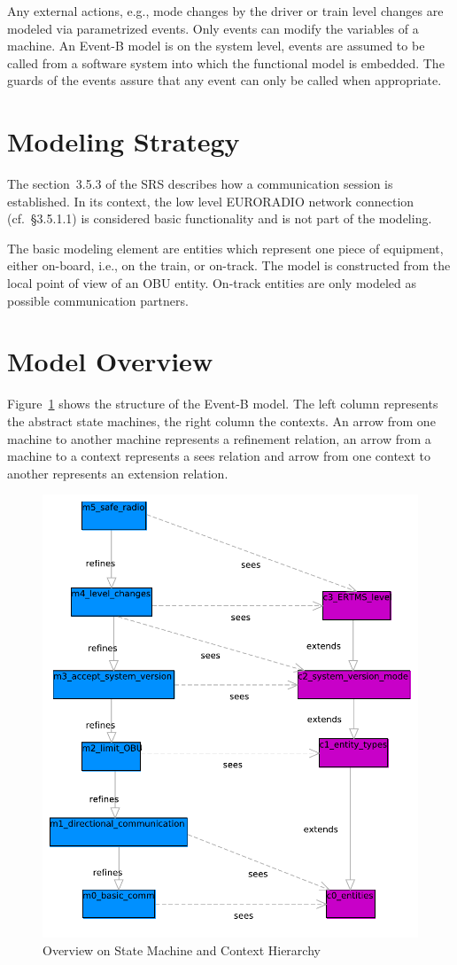 \documentclass{template/openetcs_article}
\begin{document}
Any external actions, e.g., mode changes by the driver or train level changes
are modeled via parametrized events. Only events can modify the variables of a
machine. An Event-B model is on the system level, events are assumed to be
called from a software system into which the functional model is embedded. The
guards of the events assure that any event can only be called when appropriate.

\section{Modeling Strategy}
\label{sec:modeling-strategy}

The section~3.5.3 of the SRS describes how a communication session is
established. In its context, the low level EURORADIO network connection
(cf.~§3.5.1.1) is considered basic functionality and is not part of the
modeling.

The basic modeling element are entities which represent one piece of equipment,
either on-board, i.e., on the train, or on-track. The model is constructed from
the local point of view of an OBU entity. On-track entities are only modeled as
possible communication partners.

\section{Model Overview}
\label{sec:model-overview}

Figure~\ref{fig:model-overview} shows the structure of the Event-B model. The
left column represents the abstract state machines, the right column the
contexts. An arrow from one machine to another machine represents a refinement
relation, an arrow from a machine to a context represents a sees relation and
arrow from one context to another represents an extension relation.

\begin{figure}[ht]
  \centering
  \includegraphics[width=.65\textwidth]{Subset_026_comm_session}
  \caption{Overview on State Machine and Context Hierarchy}
  \label{fig:model-overview}
\end{figure}
\end{document}
